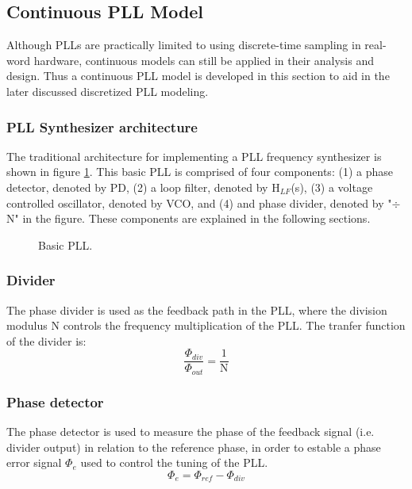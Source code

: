 \subsection{Continuous PLL Model}
Although PLLs are practically limited to using discrete-time sampling in real-word hardware, continuous models can still be applied in their analysis and design. Thus a continuous PLL model is developed in this section to aid in the later discussed discretized PLL modeling.

\subsubsection{PLL Synthesizer architecture}
The traditional architecture for implementing a PLL frequency synthesizer \cite{Razavi1996DesignOM} is shown in figure \ref{fig:basic_pll}. This basic PLL is comprised of four components: (1) a phase detector, denoted by PD, (2) a loop filter, denoted by H$_{LF}$(s), (3) a voltage controlled oscillator, denoted by VCO, and (4) and phase divider, denoted by "$\div$ N" in the figure. These components are explained in the following sections.
\begin{figure}[htb!]
	\center
	\caption{Basic PLL.}
	\label{fig:basic_pll}
\end{figure}
\FloatBarrier
\subsubsection{Divider}
The phase divider is used as the feedback path in the PLL, where the division modulus N controls the frequency multiplication of the PLL. The tranfer function of the divider is:
\begin{equation}
	\frac{\Phi_{div}}{\Phi_{out}} = \frac{1}{\mathrm{N}}
\end{equation}
\subsubsection{Phase detector}
The phase detector is used to measure the phase of the feedback signal (i.e. divider output) in relation to the reference phase, in order to estable a phase error signal $\Phi_e$ used to control the tuning of the PLL.
\begin{equation}
\Phi_e = \Phi_{ref} - \Phi_{div}
\end{equation}
